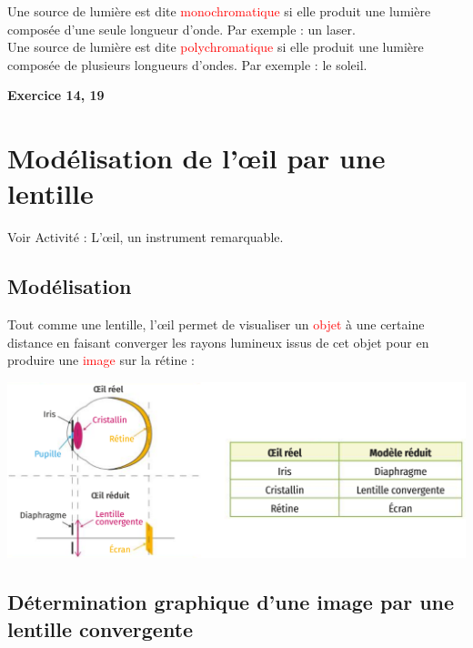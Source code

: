 \begin{tcolorbox}[colback=green!5!white,colframe=green!75!black,title=\textbf{Source monochromatique ou polychromatique:}]
Une source de lumière est dite \textcolor{red}{monochromatique} si elle produit une lumière composée d'une seule longueur d'onde. Par exemple : un laser.\\

Une source de lumière est dite \textcolor{red}{polychromatique} si elle produit une lumière composée de plusieurs longueurs d'ondes. Par exemple : le soleil.
\end{tcolorbox}

\begin{Large}
\end{Large}\textbf{Exercice 14, 19}
\section{Modélisation de l'\oe il par une lentille}
\begin{Large}
\end{Large}
Voir Activité : L'\oe il, un instrument remarquable.

\subsection{Modélisation}
Tout comme une lentille, l'\oe il permet de visualiser un \textcolor{red}{objet} à une certaine distance en faisant converger les rayons lumineux issus de cet objet pour en produire une \textcolor{red}{image} sur la rétine :
\begin{center}
    \includegraphics[scale=0.5]{Images/Modele_oeil.PNG}
\end{center}

\subsection{Détermination graphique d'une image par une lentille convergente}

